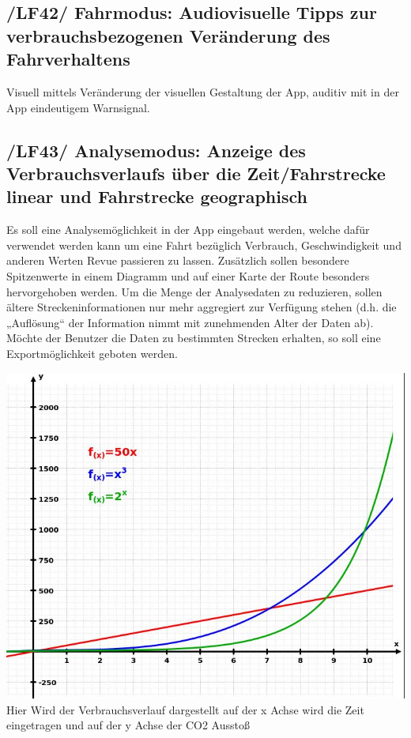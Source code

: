 \subsection{/LF42/ Fahrmodus: Audiovisuelle Tipps zur verbrauchsbezogenen Veränderung des Fahrverhaltens}
\nextline
Visuell mittels Veränderung der visuellen Gestaltung der App, auditiv mit in der App eindeutigem Warnsignal.

\subsection{/LF43/ Analysemodus: Anzeige des Verbrauchsverlaufs über die Zeit/Fahrstrecke linear und Fahrstrecke geographisch}
\nextline
Es soll eine Analysemöglichkeit in der App eingebaut werden, welche dafür verwendet werden kann um eine Fahrt bezüglich Verbrauch, Geschwindigkeit und anderen Werten Revue passieren zu lassen. Zusätzlich sollen besondere Spitzenwerte in einem Diagramm und auf einer Karte der Route besonders hervorgehoben werden. Um die Menge der Analysedaten zu reduzieren, sollen ältere Streckeninformationen nur mehr aggregiert zur Verfügung stehen (d.h. die „Auflösung“ der Information nimmt mit zunehmenden Alter der Daten ab). Möchte der Benutzer die Daten zu bestimmten Strecken erhalten, so soll eine Exportmöglichkeit geboten werden.

\includegraphics[scale=0.7]{images/LF43_Diagramm.jpg}
\nextline
Hier Wird der Verbrauchsverlauf dargestellt auf der x Achse wird die Zeit eingetragen und auf der y Achse der CO2 Ausstoß

